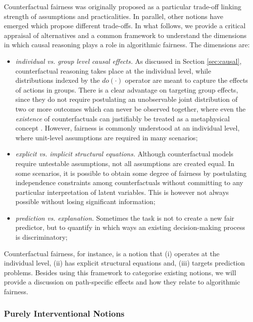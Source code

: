 \documentclass{article}
\begin{document}
Counterfactual fairness was originally proposed as a particular
trade-off linking strength of assumptions and practicalities. In
parallel, other notions have emerged which propose different
trade-offs. In what follows, we provide a critical appraisal of alternatives and a
common framework to understand the dimensions in which causal
reasoning plays a role in algorithmic fairness. The dimensions are:
\begin{itemize}
\item \emph{individual vs. group level causal effects.} As discussed
  in Section \ref{sec:causal}, counterfactual reasoning takes place
  at the individual level, while distributions indexed by the $do(\cdot)$
  operator are meant to capture the effects of actions in groups.
  There is a clear advantage on targeting group effects, since they
  do not require postulating an unobservable joint distribution of two
  or more outcomes which can never be observed together, where even the
  \emph{existence} of counterfactuals can justifiably be treated as
  a metaphysical concept \cite{dawid:00}. However, fairness is commonly
  understood at an individual level, where unit-level assumptions are required in many scenarios;
\item \emph{explicit vs. implicit structural equations.} Although
  counterfactual models require untestable assumptions, not all
  assumptions are created equal. In some scenarios, it is possible
  to obtain some degree of fairness by postulating independence constraints
  among counterfactuals without committing to any particular interpretation
  of latent variables. This is however not always possible without losing significant information;
\item \emph{prediction vs. explanation.} Sometimes the task is not to
  create a new fair predictor, but to quantify in which ways an existing
  decision-making process is discriminatory;
\end{itemize}

Counterfactual fairness, for instance, is a notion that (i) operates at
the individual level, (ii) has explicit structural equations and, (iii) targets
prediction problems. Besides using this framework to categorise
existing notions, we will provide a discussion on path-specific
effects and how they relate to algorithmic fairness.

\subsubsection{Purely Interventional Notions}
\end{document}

